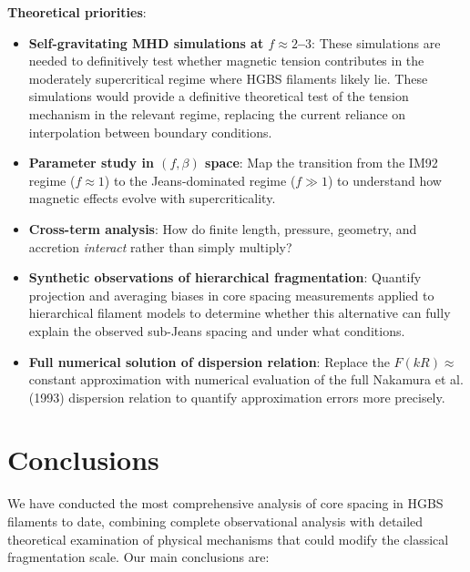\documentclass[11pt,a4paper]{article}
\begin{document}
\textbf{Theoretical priorities}:
\begin{itemize}
    \item \textbf{Self-gravitating MHD simulations at $f \approx 2$--$3$}: These simulations are needed to definitively test whether magnetic tension contributes in the moderately supercritical regime where HGBS filaments likely lie. These simulations would provide a definitive theoretical test of the tension mechanism in the relevant regime, replacing the current reliance on interpolation between boundary conditions.
    \item \textbf{Parameter study in $(f, \beta)$ space}: Map the transition from the IM92 regime ($f \approx 1$) to the Jeans-dominated regime ($f \gg 1$) to understand how magnetic effects evolve with supercriticality.
    \item \textbf{Cross-term analysis}: How do finite length, pressure, geometry, and accretion \textit{interact} rather than simply multiply?
    \item \textbf{Synthetic observations of hierarchical fragmentation}: Quantify projection and averaging biases in core spacing measurements applied to hierarchical filament models to determine whether this alternative can fully explain the observed sub-Jeans spacing and under what conditions.
    \item \textbf{Full numerical solution of dispersion relation}: Replace the $F(kR) \approx$ constant approximation with numerical evaluation of the full Nakamura et al. (1993) dispersion relation to quantify approximation errors more precisely.
\end{itemize}

\section{Conclusions}
\label{sec:conclusions}

We have conducted the most comprehensive analysis of core spacing in HGBS filaments to date, combining complete observational analysis with detailed theoretical examination of physical mechanisms that could modify the classical fragmentation scale. Our main conclusions are:
\end{document}
